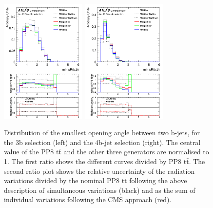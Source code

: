 \begin{figure}[!htb]
\centering
\includegraphics[width=0.38\textwidth]{Plots/ttbb/hisgenEvt_Dr_MinDeltaRGenBJets_4j3t__div}
\includegraphics[width=0.38\textwidth]{Plots/ttbb/hisgenEvt_Dr_MinDeltaRGenBJets_4j4t__div}
  \caption{Distribution of the smallest opening angle between two b-jets, for the 3b selection (left) and the 4b-jet selection (right). The central value of the PP8 $\mathrm{t\bar{t}}$ and the other three generators are normalised to 1. The first ratio shows the different curves divided by PP8 $\mathrm{t\bar{t}}$. The second ratio plot shows the relative uncertainty of the radiation variations divided by the nominal PP8 $\mathrm{t\bar{t}}$ following the above description of simultaneous variations (black) and as the sum of individual variations following the CMS approach (red). \label{ttbb:mindR}}
\end{figure}

